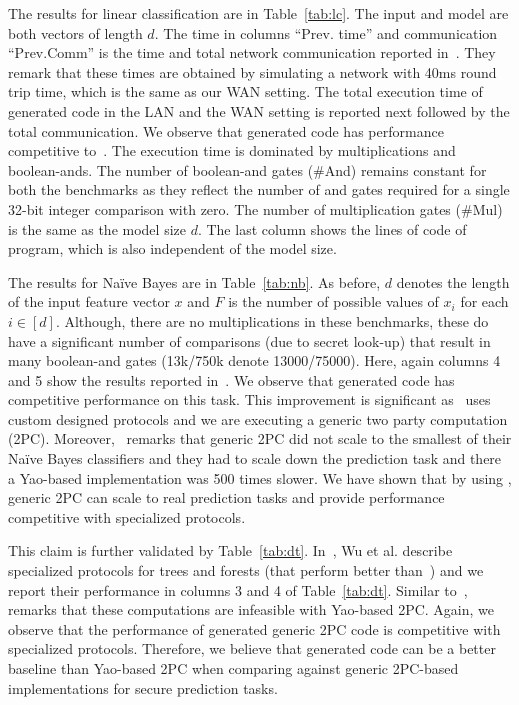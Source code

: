 The results for linear classification are in Table~\ref{tab:lc}. The input and model are both vectors of length $d$. The time in columns ``Prev. time'' and communication ``Prev.Comm'' is the time and total network communication reported in~\cite{shafindss}. They remark that these times are obtained by simulating a network with 40ms round trip time, which is the same as our WAN setting. The total execution time of \tool generated code in the LAN and the WAN setting is reported next followed by the total communication.
We observe that \tool generated code has performance competitive to~\cite{shafindss}.
The execution time is dominated by multiplications and boolean-ands.
The number of boolean-and gates (\#And) remains constant for both the benchmarks as they reflect the number of and gates required for a single 32-bit integer comparison with zero. The number of multiplication gates (\#Mul) is the same as the model size $d$. The last column shows the lines of code of \tool program, which is also independent of the model size.

The results for Na\"{i}ve Bayes are in Table~\ref{tab:nb}. As before, $d$ denotes the length of the input feature vector $x$ and $F$ is the number of possible values of $x_i$ for each $i \in [d]$.
Although, there are no multiplications in these benchmarks, these do have a significant number of comparisons (due to secret look-up) that result in many boolean-and gates (13k/750k denote 13000/75000). 
Here, again columns 4 and 5 show the results reported in~\cite{shafindss}. We observe that \tool generated code has competitive performance on this task. This improvement is significant as~\cite{shafindss} uses custom designed protocols and we are executing a generic two party computation (2PC). Moreover,~\cite{shafindss} remarks that generic 2PC did not scale to the smallest of their Na\"{i}ve Bayes classifiers and they had to scale down the prediction task and there a Yao-based implementation was 500 times slower. We have shown that by using \tool, generic 2PC can scale to real prediction tasks and provide performance competitive with specialized protocols. 

This claim is further validated by Table~\ref{tab:dt}.
In~\cite{wu}, Wu et al. describe specialized protocols for trees and forests (that perform better than~\cite{shafindss}) and we report their performance in columns 3 and 4 of Table~\ref{tab:dt}.
Similar to~\cite{shafindss},~\cite{wu} remarks that these computations are infeasible with Yao-based 2PC.
Again, we observe that the performance of \tool generated generic 2PC code is competitive with specialized protocols. Therefore, we believe that \tool generated code can be a better baseline than Yao-based 2PC when comparing against generic 2PC-based implementations for secure prediction tasks.

